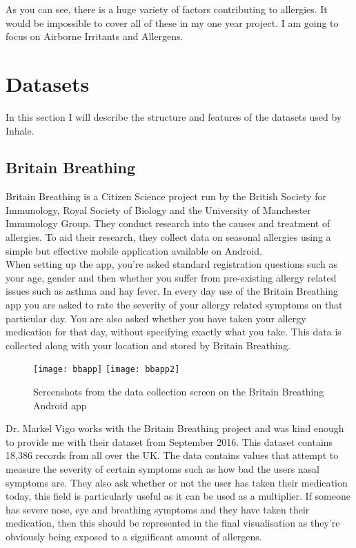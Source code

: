 As you can see, there is a huge variety of factors contributing to allergies. It would be impossible to cover all of these in my one year project. I am going to focus on Airborne Irritants and Allergens.


\section{Datasets}

In this section I will describe the structure and features of the datasets used by Inhale.\\

\subsection{Britain Breathing}

Britain Breathing is a Citizen Science project run by the British Society for Immunology, Royal Society of Biology and the University of Manchester Immunology Group. They conduct research into the causes and treatment of allergies. To aid their research, they collect data on seasonal allergies using a simple but effective mobile application available on Android.\\

When setting up the app, you're asked standard registration questions such as your age, gender and then whether you suffer from pre-existing allergy related issues such as asthma and hay fever. In every day use of the Britain Breathing app you are asked to rate the severity of your allergy related symptoms on that particular day. You are also asked whether you have taken your allergy medication for that day, without specifying exactly what you take. This data is collected along with your location and stored by Britain Breathing.

\begin{figure}[H]
\begin{center}
\texttt{[image: bbapp]}
\texttt{[image: bbapp2]}
\caption{Screenshots from the data collection screen on the Britain Breathing Android app}
\label{fig:bbscrn}
\end{center}
\end{figure}

Dr. Markel Vigo works with the Britain Breathing project and was kind enough to provide me with their dataset from September 2016. This dataset contains 18,386 records from all over the UK. The data contains values that attempt to measure the severity of certain symptoms such as how bad the users nasal symptoms are. They also ask whether or not the user has taken their medication today, this field is particularly useful as it can be used as a multiplier. If someone has severe nose, eye and breathing symptoms and they have taken their medication, then this should be represented in the final visualisation as they're obviously being exposed to a significant amount of allergens.\\

